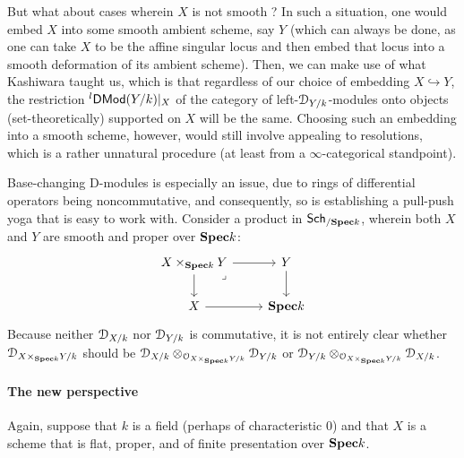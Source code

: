             But what about cases wherein $X$ is not smooth ? In such a situation, one would embed $X$ into some smooth ambient scheme, say $Y$ (which can always be done, as one can take $X$ to be the affine singular locus and then embed that locus into a smooth deformation of its ambient scheme). Then, we can make use of what Kashiwara taught us, which is that regardless of our choice of embedding $X \hookrightarrow Y$, the restriction ${}^l\mathsf{DMod}(Y/k)|_X$ of the category of left-$\mathcal{D}_{Y/k}$-modules onto objects (set-theoretically) supported on $X$ will be the same. Choosing such an embedding into a smooth scheme, however, would still involve appealing to resolutions, which is a rather unnatural procedure (at least from a $\infty$-categorical standpoint).
            
            Base-changing D-modules is especially an issue, due to rings of differential operators being noncommutative, and consequently, so is establishing a pull-push yoga that is easy to work with. Consider a product in $\mathsf{Sch}_{/\mathbf{Spec} k}$, wherein both $X$ and $Y$ are smooth and proper over $\mathbf{Spec} k$:
                $$
                    \begin{tikzcd}
                    	{X \x_{\Spec k} Y} & Y \\
                    	X & {\Spec k}
                    	\arrow[from=1-2, to=2-2]
                    	\arrow[from=2-1, to=2-2]
                    	\arrow[from=1-1, to=1-2]
                    	\arrow[from=1-1, to=2-1]
                    	\arrow["\lrcorner"{anchor=center, pos=0.125}, draw=none, from=1-1, to=2-2]
                    \end{tikzcd}
                $$
            Because neither $\mathcal{D}_{X/k}$ nor $\mathcal{D}_{Y/k}$ is commutative, it is not entirely clear whether $\D_{X \x_{\Spec k} Y/k}$ should be $\D_{X/k} \tensor_{\calO_{X \x_{\Spec k} Y/k}} \D_{Y/k}$ or $\D_{Y/k} \tensor_{\calO_{X \x_{\Spec k} Y/k}} \D_{X/k}$. 
        
        \paragraph*{The new perspective}
            Again, suppose that $k$ is a field (perhaps of characteristic $0$) and that $X$ is a scheme that is flat, proper, and of finite presentation over $\mathbf{Spec} k$.
        

